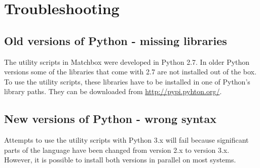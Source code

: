 \section{Troubleshooting}

\subsection{Old versions of Python - missing libraries}

The utility scripts in Matchbox were developed in Python 2.7. In older Python
versions some of the libraries that come with 2.7 are not installed out of the box. 
To use the utility scripts, these libraries have to be installed in one of Python's
library paths. They can be downloaded from \url{http://pypi.pyhton.org/}.

\subsection{New versions of Python - wrong syntax}

Attempts to use the utility scripts with Python 3.x will fail because
significant parts of the language have been changed from version 2.x to version
3.x. However, it is possible to install both versions in parallel on most
systems.

